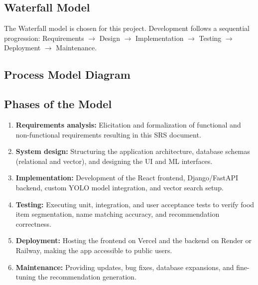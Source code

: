 \documentclass[11pt,a4paper]{article}
\begin{document}
\subsection{Waterfall Model}
The Waterfall model is chosen for this project. Development follows a sequential progression: Requirements $\rightarrow$ Design $\rightarrow$ Implementation $\rightarrow$ Testing $\rightarrow$ Deployment $\rightarrow$ Maintenance.

\subsection{Process Model Diagram}
\begin{center}
\end{center}

\subsection{Phases of the Model}
\begin{enumerate}[leftmargin=*]
  \item \textbf{Requirements analysis:} Elicitation and formalization of functional and non-functional requirements resulting in this SRS document.
  \item \textbf{System design:} Structuring the application architecture, database schemas (relational and vector), and designing the UI and ML interfaces.
  \item \textbf{Implementation:} Development of the React frontend, Django/FastAPI backend, custom YOLO model integration, and vector search setup.
  \item \textbf{Testing:} Executing unit, integration, and user acceptance tests to verify food item segmentation, name matching accuracy, and recommendation correctness.
  \item \textbf{Deployment:} Hosting the frontend on Vercel and the backend on Render or Railway, making the app accessible to public users.
  \item \textbf{Maintenance:} Providing updates, bug fixes, database expansions, and fine-tuning the recommendation generation.
\end{enumerate}
\end{document}
